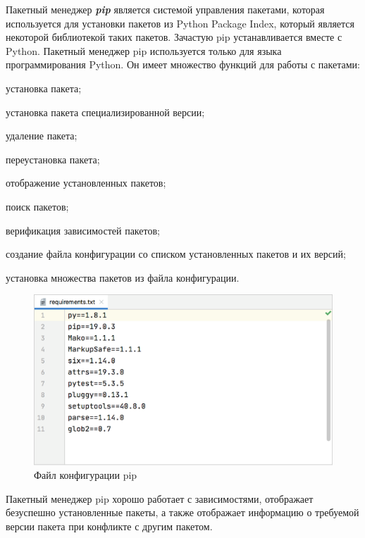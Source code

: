 Пакетный менеджер \textbf{\textit{pip}} является системой управления пакетами, которая используется для установки пакетов из Python Package Index, который является некоторой библиотекой таких пакетов. Зачастую pip устанавливается вместе с Python. Пакетный менеджер pip используется только для языка программирования Python. 
Он имеет множество функций для работы с пакетами:

\begin{textitemize}
	\item установка пакета;
	\item установка пакета специализированной версии;
	\item удаление пакета;
	\item переустановка пакета;
	\item отображение установленных пакетов;
	\item поиск пакетов;
	\item верификация зависимостей пакетов;
	\item создание файла конфигурации со списком установленных пакетов и их версий;
	\item установка множества пакетов из файла конфигурации.
\end{textitemize}

\begin{figure}[H]
	\includegraphics[scale=0.3]{author/part5/figures/pip.png}
	\caption{Файл конфигурации pip}
	\label{fig:pip}
\end{figure}

Пакетный менеджер pip хорошо работает с зависимостями, отображает безуспешно установленные пакеты, а также отображает информацию о требуемой версии пакета при конфликте с другим пакетом.

